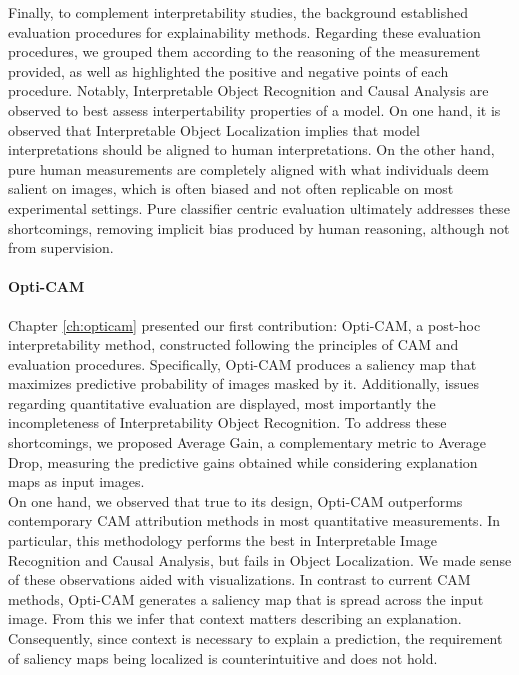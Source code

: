 \noindent Finally, to complement interpretability studies, the background established
evaluation procedures for explainability methods. Regarding these evaluation procedures, we grouped 
them according to the reasoning of the measurement provided, as well as highlighted the positive 
and negative points of each procedure. Notably, Interpretable Object Recognition and 
Causal Analysis are observed to best assess interpertability properties of a model. On one 
hand, it is observed that Interpretable Object Localization implies that model 
interpretations should be aligned to human interpretations. On the other hand, pure human 
measurements are completely aligned with what individuals deem salient on images, which is often 
biased and not often replicable on most experimental settings. Pure classifier centric evaluation 
ultimately addresses these shortcomings, removing implicit bias produced by human reasoning, 
although not from supervision.\\

\paragraph{Opti-CAM}
\noindent Chapter \ref{ch:opticam} presented our first contribution: Opti-CAM, a post-hoc 
interpretability method, constructed following the principles of CAM and evaluation 
procedures. Specifically, Opti-CAM produces a saliency map that maximizes predictive probability 
of images masked by it. Additionally, issues regarding quantitative evaluation are displayed, 
most importantly the incompleteness of Interpretability Object Recognition. To address these 
shortcomings, we proposed Average Gain, a complementary metric to Average Drop, measuring 
the predictive gains obtained while considering explanation maps as input images.\\


\noindent On one hand, we observed that true to its design, Opti-CAM outperforms contemporary 
CAM attribution methods in most quantitative measurements. In particular, this methodology 
performs the best in Interpretable Image Recognition and Causal Analysis, but fails in Object 
Localization. We made sense of these observations aided with visualizations. In contrast to 
current CAM methods, Opti-CAM generates a saliency map that is spread across the input image. 
From this we infer that context matters describing an explanation. Consequently, since context is 
necessary to explain a prediction, the requirement of saliency maps being localized is 
counterintuitive and does not hold.\\

